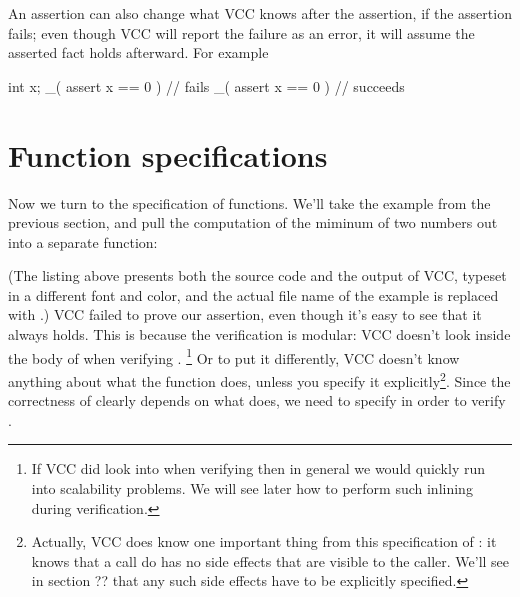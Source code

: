 

An assertion can also change what VCC knows after the assertion, if
the assertion fails; even though VCC will report the failure as an error,
it will assume the asserted fact holds afterward. For example
\begin{VCC}
int x;
_( assert x == 0 ) // fails
_( assert x == 0 ) // succeeds
\end{VCC}

\section{Function specifications}

Now we turn to the specification of functions. We'll take the example
from the previous section, and pull the computation of the miminum of
two numbers out into a separate function:


(The listing above presents both the source code and the output
of VCC, typeset in a different font and color, and 
the actual file name of the example is replaced with .)
VCC failed to prove our assertion, even though it's easy to see that
it always holds. This is because the verification is modular: VCC
doesn't look inside the body of  when verifying .%
\footnote{
  If VCC did look into  when verifying 
  then in general we would quickly run into scalability problems.
  We will see later how to perform such inlining during verification.
}
Or to put it differently, VCC doesn't know anything about what the
 function does, unless you specify it explicitly\footnote{
  Actually, VCC does know one important thing from this specification
  of : it knows that a call do  has no side
  effects that are visible to the caller. We'll see in section ?? that
  any such side effects have to be explicitly specified.
}.
Since the correctness of  clearly depends on what 
does, we need to specify  in order to verify .

